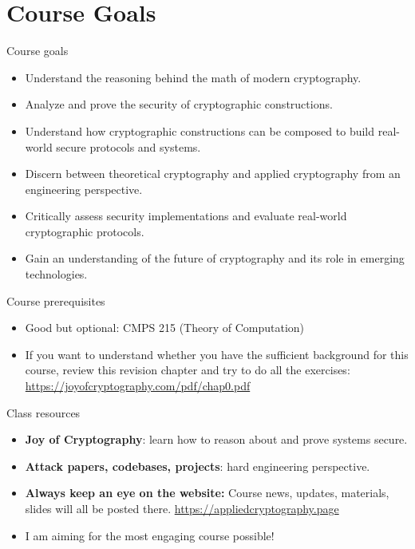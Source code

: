 \documentclass[aspectratio=169, lualatex, handout]{beamer}
\begin{document}
\section{Course Goals}

\begin{frame}{Course goals}
	\begin{itemize}[<+->]
		\item Understand the reasoning behind the math of modern cryptography.
		\item Analyze and prove the security of cryptographic constructions.
		\item Understand how cryptographic constructions can be composed to build real-world
		      secure protocols and systems.
		\item Discern between theoretical cryptography and applied cryptography from
		      an engineering perspective.
		\item Critically assess security implementations and evaluate real-world cryptographic
		      protocols.
		\item Gain an understanding of the future of cryptography and its role in emerging
		      technologies.
	\end{itemize}
\end{frame}

\begin{frame}{Course prerequisites}
	\begin{itemize}
		\item Good but optional: CMPS 215 (Theory of Computation)
		\item If you want to understand whether you have the sufficient background for this course, review this revision chapter and try to do all the exercises: \url{https://joyofcryptography.com/pdf/chap0.pdf}
	\end{itemize}
\end{frame}

\begin{frame}{Class resources}
	\begin{itemize}[<+->]
		\item \textbf{Joy of Cryptography}: learn how to reason about and prove systems secure.
		\item \textbf{Attack papers, codebases, projects}: hard engineering perspective.
		      \vspace{1cm}
		\item \textbf{Always keep an eye on the website:} Course news, updates,
		      materials, slides will all be posted there.
		      \url{https://appliedcryptography.page}
		\item I am aiming for the most engaging course possible!
	\end{itemize}
\end{frame}
\end{document}
